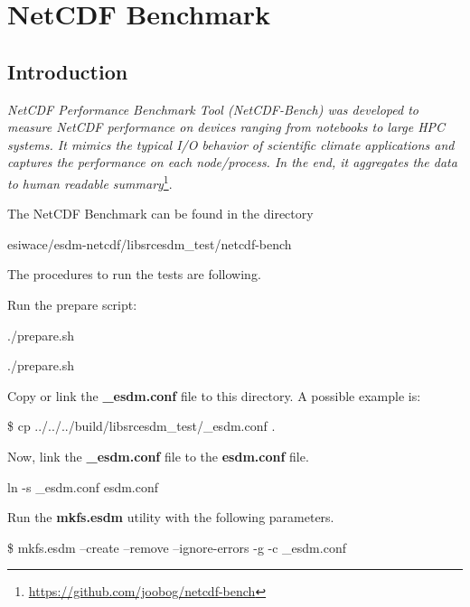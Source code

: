 \chapter{NetCDF Benchmark}

\section{Introduction}

\tab
\textit{NetCDF Performance Benchmark Tool (NetCDF-Bench) was developed to measure NetCDF performance on devices ranging from notebooks to large HPC systems. It mimics the typical I/O behavior of scientific climate applications and captures the performance on each node/process. In the end, it aggregates the data to human readable summary}\footnote{\url{https://github.com/joobog/netcdf-bench}}.

The NetCDF Benchmark can be found in the directory

\begin{framed}
esiwace/esdm-netcdf/libsrcesdm\_test/netcdf-bench
\end{framed}

The procedures to run the tests are following.

Run the prepare script:

\begin{framed}
./prepare.sh
\end{framed}

\begin{framed}
./prepare.sh
\end{framed}

Copy or link the \textbf{\_esdm.conf} file to this directory. A possible example is:

\begin{framed}
\$ cp ../../../build/libsrcesdm\_test/\_esdm.conf .
\end{framed}

Now, link the \textbf{\_esdm.conf} file to the \textbf{esdm.conf} file.

\begin{framed}
ln -s \_esdm.conf esdm.conf
\end{framed}

Run the \textbf{mkfs.esdm} utility with the following parameters.

\begin{framed}
\$ mkfs.esdm --create --remove --ignore-errors -g -c \_esdm.conf
\end{framed}

